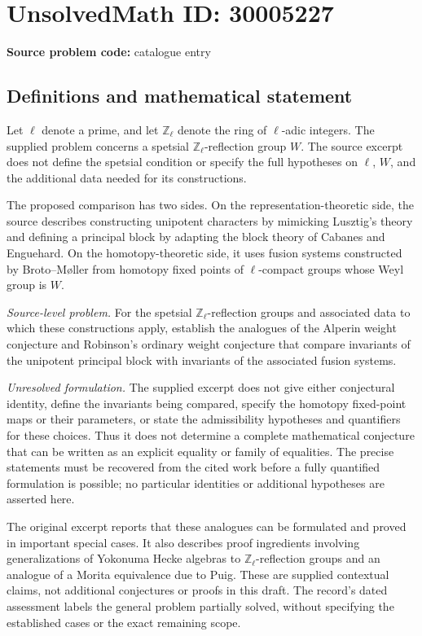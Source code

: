 \documentclass[11pt]{article}
\begin{document}
\section*{UnsolvedMath ID: 30005227}
\textbf{Source problem code:} catalogue entry
\subsection{Definitions and mathematical statement}
Let \(\ell\) denote a prime, and let \(\mathbb Z_\ell\) denote the ring of \(\ell\)-adic integers. The supplied problem concerns a spetsial \(\mathbb Z_\ell\)-reflection group \(W\). The source excerpt does not define the spetsial condition or specify the full hypotheses on \(\ell\), \(W\), and the additional data needed for its constructions.

The proposed comparison has two sides. On the representation-theoretic side, the source describes constructing unipotent characters by mimicking Lusztig's theory and defining a principal block by adapting the block theory of Cabanes and Enguehard. On the homotopy-theoretic side, it uses fusion systems constructed by Broto--M\o ller from homotopy fixed points of \(\ell\)-compact groups whose Weyl group is \(W\).

\emph{Source-level problem.} For the spetsial \(\mathbb Z_\ell\)-reflection groups and associated data to which these constructions apply, establish the analogues of the Alperin weight conjecture and Robinson's ordinary weight conjecture that compare invariants of the unipotent principal block with invariants of the associated fusion systems.

\emph{Unresolved formulation.} The supplied excerpt does not give either conjectural identity, define the invariants being compared, specify the homotopy fixed-point maps or their parameters, or state the admissibility hypotheses and quantifiers for these choices. Thus it does not determine a complete mathematical conjecture that can be written as an explicit equality or family of equalities. The precise statements must be recovered from the cited work before a fully quantified formulation is possible; no particular identities or additional hypotheses are asserted here.

The original excerpt reports that these analogues can be formulated and proved in important special cases. It also describes proof ingredients involving generalizations of Yokonuma Hecke algebras to \(\mathbb Z_\ell\)-reflection groups and an analogue of a Morita equivalence due to Puig. These are supplied contextual claims, not additional conjectures or proofs in this draft. The record's dated assessment labels the general problem partially solved, without specifying the established cases or the exact remaining scope.
\end{document}
